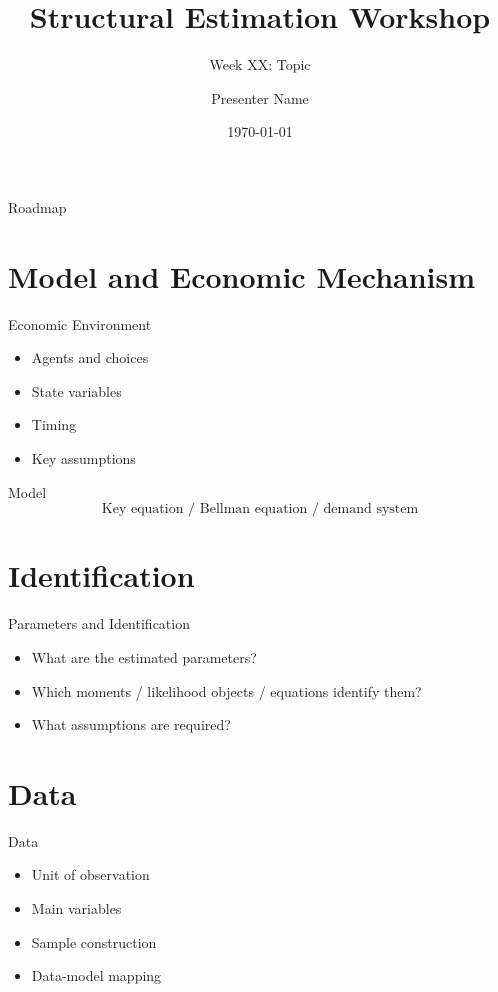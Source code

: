 \documentclass[aspectratio=169]{beamer}
\title{Structural Estimation Workshop}
\subtitle{Week XX: Topic}
\author{Presenter Name}
\institute{HKUST(Guangzhou)}
\date{\today}
\begin{document}
\begin{frame}
  \titlepage
\end{frame}

\begin{frame}{Roadmap}
  \tableofcontents
\end{frame}

\section{Model and Economic Mechanism}

\begin{frame}{Economic Environment}
\begin{itemize}
    \item Agents and choices
    \item State variables
    \item Timing
    \item Key assumptions
\end{itemize}
\end{frame}

\begin{frame}{Model}
\[
    \text{Key equation / Bellman equation / demand system}
\]
\end{frame}

\section{Identification}

\begin{frame}{Parameters and Identification}
\begin{itemize}
    \item What are the estimated parameters?
    \item Which moments / likelihood objects / equations identify them?
    \item What assumptions are required?
\end{itemize}
\end{frame}

\section{Data}

\begin{frame}{Data}
\begin{itemize}
    \item Unit of observation
    \item Main variables
    \item Sample construction
    \item Data-model mapping
\end{itemize}
\end{frame}
\end{document}

